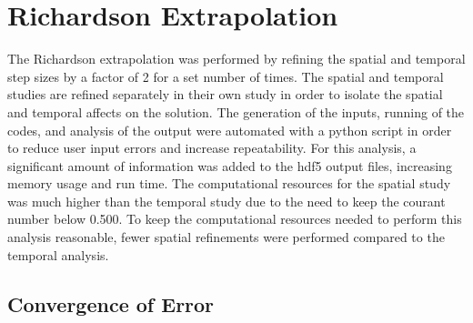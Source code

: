 \documentclass{mc2015}
\begin{document}
%    
%    
%    

\section{Richardson Extrapolation}

The Richardson extrapolation was performed by refining the spatial and temporal
step sizes by a factor of 2 for a set number of times. The spatial and temporal
studies are refined separately in their own study in order to isolate the
spatial and temporal affects on the solution. The generation of the inputs,
running of the codes, and analysis of the output were automated with a python
script in order to reduce user input errors and increase repeatability.  For
this analysis, a significant amount of information was added to the hdf5 output
files, increasing memory usage and run time. The computational resources for the
spatial study was much higher than the temporal study due to the need to keep
the courant number below 0.500. To keep the computational resources needed
to perform this analysis reasonable, fewer spatial refinements were performed
compared to the temporal analysis.

\subsection{Convergence of Error}
\end{document}
